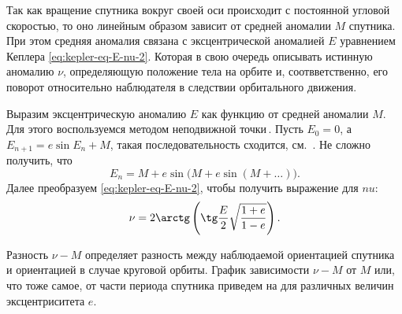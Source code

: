 Так как вращение спутника вокруг своей оси происходит с постоянной угловой скоростью, то оно линейным образом зависит от средней аномалии $M$ спутника. При этом средняя аномалия связана с эксцентрической аномалией $E$ уравнением Кеплера \eqref{eq:kepler-eq-E-nu-2}. Которая в свою очередь описывать истинную аномалию $\nu$, определяющую положение тела на орбите и, соотвветственно, его поворот относительно наблюдателя в следствии орбитального движения.

Выразим эксцентрическую аномалию $E$ как функцию от средней аномалии $M$. Для этого воспользуемся методом неподвижной точки\,\cite{balk_dynamic_space_flight}. Пусть $E_0 = 0$, а $E_{n+1} = e \sin E_n + M$, такая последовательность сходится, см.~\cite{balk_dynamic_space_flight}. Не сложно  получить, что
\begin{equation*}
    E_n = M + e \sin \big( M + e \sin ( M + \ldots) \big).
\end{equation*}
Далее преобразуем \eqref{eq:kepler-eq-E-nu-2}, чтобы получить выражение для $nu$:
\begin{equation*}
    \nu = 2 \arctg \left( \tg \frac{E}{2} \sqrt{\frac{1 + e}{1 - e}} \right).
\end{equation*}

Разность $\nu - M$ определяет разность между наблюдаемой ориентацией спутника и ориентацией в случае круговой орбиты. График зависимости $\nu - M$ от $M$ или, что тоже самое, от части периода спутника приведем на  для различных величин эксцентриситета $e$.


